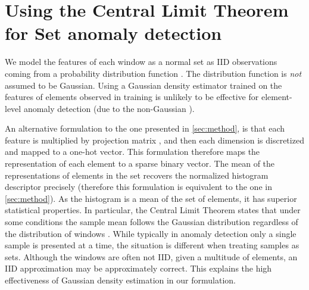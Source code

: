 \documentclass{article}
\begin{document}
\section{Using the Central Limit Theorem for Set anomaly detection}
\label{app:gaussian}
We model the features of each window  as a normal set as IID observations coming from a probability distribution function . The distribution function is \textit{not} assumed to be Gaussian. Using a Gaussian density estimator trained on the features of elements observed in training is unlikely to be effective for element-level anomaly detection (due to the non-Gaussian ). 

An alternative formulation to the one presented in \cref{sec:method}, is that each feature  is multiplied by projection matrix , and then each dimension is discretized and mapped to a one-hot vector. This formulation therefore maps the representation of each element to a sparse binary vector. The mean of the representations of elements in the set recovers the normalized histogram descriptor precisely (therefore this formulation is equivalent to the one in \cref{sec:method}).
As the histogram is a mean of the set of elements, it has superior statistical properties. In particular, the Central Limit Theorem states that under some conditions the sample mean follows the Gaussian distribution regardless of the distribution of windows . While typically in anomaly detection only a single sample is presented at a time, the situation is different when treating samples as sets. Although the windows are often not IID, given a multitude of elements, an IID approximation may be approximately correct. This explains the high effectiveness of Gaussian density estimation in our formulation.
\end{document}
